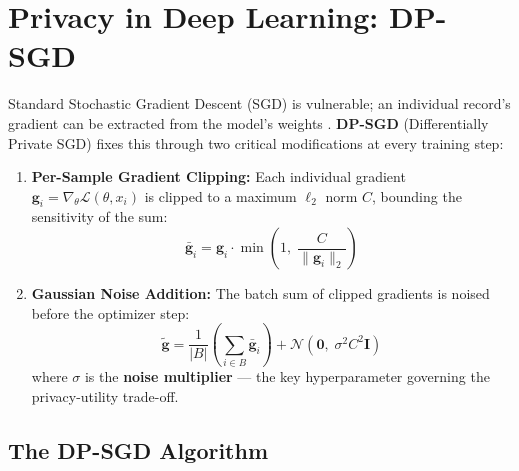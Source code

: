 \section{Privacy in Deep Learning: DP-SGD}
\label{sec:dp_sgd}

Standard Stochastic Gradient Descent (SGD) is vulnerable; an individual record's gradient can be extracted from the model's weights \cite{zhu2019}. \textbf{DP-SGD} (Differentially Private SGD) fixes this through two critical modifications at every training step:

\begin{enumerate}
    \item \textbf{Per-Sample Gradient Clipping:} Each individual gradient $\mathbf{g}_i = \nabla_\theta \mathcal{L}(\theta, x_i)$ is clipped to a maximum $\ell_2$ norm $C$, bounding the sensitivity of the sum:
    \begin{equation}
      \bar{\mathbf{g}}_i = \mathbf{g}_i \cdot \min\!\left(1,\; \frac{C}{\|\mathbf{g}_i\|_2}\right)
      \label{eq:dp_clipping}
    \end{equation}
    \item \textbf{Gaussian Noise Addition:} The batch sum of clipped gradients is noised before the optimizer step:
    \begin{equation}
      \tilde{\mathbf{g}} = \frac{1}{|B|}\left(\sum_{i \in B} \bar{\mathbf{g}}_i\right) + \mathcal{N}\!\left(\mathbf{0},\; \sigma^2 C^2 \mathbf{I}\right)
      \label{eq:dp_noise}
    \end{equation}
    where $\sigma$ is the \textbf{noise multiplier} — the key hyperparameter governing the privacy-utility trade-off.
\end{enumerate}

\subsection{The DP-SGD Algorithm}
\label{subsec:dpsgd_algorithm}

